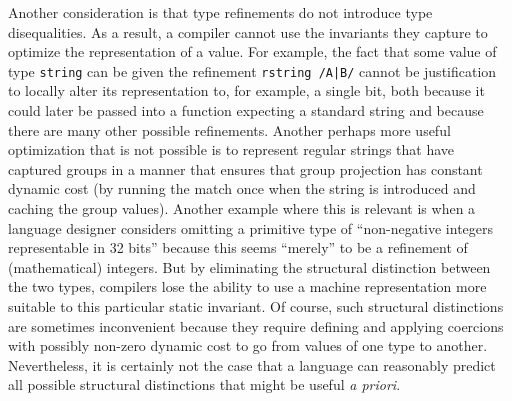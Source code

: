 Another consideration is that type refinements do not introduce type disequalities. As a result, a compiler cannot use the invariants they capture to optimize the representation of a value. For example, the fact that some value of type \lstinline{string} can be given the refinement \lstinline{rstring /A|B/} cannot be justification to locally alter its representation to, for example, a single bit, both because it could later be passed into a function expecting a standard string and because there are many other possible refinements. Another perhaps more useful optimization that is not possible is to represent regular strings that have captured groups in a manner that ensures that group projection has constant dynamic cost (by running the match once when the string is introduced and caching the group values). Another example where this is relevant is when a language designer considers omitting a primitive type of ``non-negative integers representable in 32 bits'' because this seems ``merely'' to be a refinement of (mathematical) integers. But by eliminating the structural distinction between the two types, compilers lose the ability to use a machine representation more suitable to this particular static invariant. Of course, such structural distinctions  are sometimes inconvenient because they require defining and applying coercions with possibly non-zero dynamic cost to go from values of one type to another. Nevertheless, it is certainly not the case that a language can reasonably predict all possible structural distinctions that might be useful \emph{a priori}.




